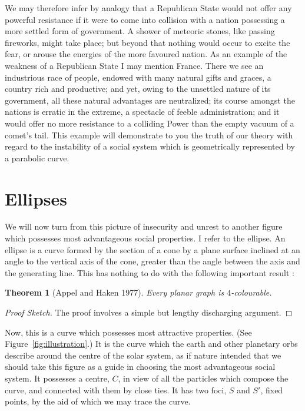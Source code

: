 \documentclass{jocg}
\theoremstyle{plain}
\newtheorem{theorem}{Theorem}
\theoremstyle{definition}
\begin{document}
We may therefore infer by analogy that a Republican State would not
offer any powerful resistance if it were to come into collision with
a nation possessing a more settled form of government. A shower of
meteoric stones, like passing fireworks, might take place; but beyond
that nothing would occur to excite the fear, or arouse the energies of
the more favoured nation. As an example of the weakness of a Republican
State I may mention France. There we see an industrious race of people,
endowed with many natural gifts and graces, a country rich and productive;
and yet, owing to the unsettled nature of its government, all these
natural advantages are neutralized; its course amongst the nations is
erratic in the extreme, a spectacle of feeble  administration; and it
would offer no more resistance to a colliding Power than the empty vacuum
of a comet's tail. This example will demonstrate to you the truth of
our theory with regard to the instability of a social system which is
geometrically represented by a parabolic curve.

\section{Ellipses}

We will now turn from this picture of insecurity and unrest to another
figure which possesses most advantageous social properties. I refer to
the ellipse. An ellipse is a curve formed by the section of a cone by
a plane surface inclined at an angle to the vertical axis of the cone,
greater than the angle between the axis and the generating line.  This has
nothing to do with the following important result \cite{ah77,rsst97}:

\begin{theorem}[Appel and Haken 1977]
  Every planar graph is $4$-colourable.
\end{theorem} 

\begin{proof}[Proof Sketch]
The proof involves a simple but lengthy discharging argument.
\end{proof}

Now, this is a curve which possesses most attractive properties. (See
Figure~\ref{fig:illustration}.) It is the curve which the earth and
other planetary orbs describe around the centre of the solar system,
as if nature intended that we should take this figure as a guide in
choosing the most advantageous social system. It possesses a centre,
$C$, in view of all the particles which compose the curve, and connected
with them by close  ties. It has two foci, $S$ and $S'$, fixed points,
by the aid of which we may trace the curve.
\end{document}
